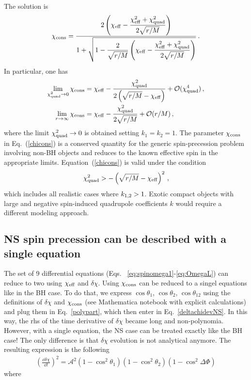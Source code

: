 \documentclass[floats,floatfix,showpacs,amssymb,prd,twocolumn,superscriptaddress,nofootinbib,nolongbibliography,reprint,onecolumn]{revtex4-2}
\newcommand{\chieff}{\chi_{\rm eff}}
\newcommand{\deltachi}{\delta \chi}
\newcommand{\chicons}{\chi_{\rm cons}}
\begin{document}
The solution is 
\begin{align}
\label{chicons}
\chi_{\rm cons} =  \frac{\displaystyle 
2 \left( \chi_{\rm eff}-\frac{\chi_{\rm eff}^2+\chi_{\rm quad}^2}{2 \sqrt{r/M}}\right)}
{\displaystyle 1+ \sqrt{1- \frac{2}{\sqrt{r/M}}\left( {\chi_{\rm eff}-\frac{\chi_{\rm eff}^2+\chi_{\rm quad}^2}{2
   \sqrt{r/M}}}\right)}}\,.
\end{align}
In particular, one has
\begin{align}
\displaystyle \lim_{\chi_{\rm quad}^2 \to  0}\chi_{\rm cons} &= \chi_{\rm eff} - \frac{\chi_{\rm quad}^2}{2\left(\sqrt{r/M} - \chi_{\rm eff}\right) } + \mathcal{O}(\chi_{\rm quad}^4)\,,
\\
\displaystyle \lim_{r\to  \infty}\chi_{\rm cons} &= \chi_{\rm eff} - \frac{\chi_{\rm quad}^2}{2 \sqrt{r/M}} + \mathcal{O}(r/M)\,, 
\end{align}
where  the limit $\chi_{\rm quad}^2 \to  0$ is obtained setting  $k_1=k_2=1$.
The parameter $\chi_{\rm cons}$ in Eq.~(\ref{chicons}) is a conserved quantity for the generic spin-precession problem involving non-BH objects and reduces to the known effective spin in the appropriate limits.  Equation~(\ref{chicons}) is valid under the condition 
\begin{align} \label{chiconscondition}
\chi_{\rm quad}^2> - \left(\sqrt{r/M} - \chi_{\rm eff}\right)^2\,,
\end{align}
 which includes all realistic cases where $k_{\rm 1,2}>1$. Exotic compact objects with large and negative spin-induced quadrupole coefficients $k$ would require a different modeling approach. 
 \subsection {NS spin precession can be described with a single equation}
The set of 9 differential equations (Eqs. ~\eqref{eq:spinomega1}-\eqref{eq:OmegaL}) can reduce to two using $\chieff$ and $\deltachi$. Using $\chicons$ can be reduced to a singel equations like in the BH case.
To do that, we express $\cos \theta_1$, $\cos \theta_2$, $\cos \theta_{12}$ using the definitions of $\deltachi$ and $\chicons$ (see Mathematica notebook with explicit calculations) and plug them in Eq.~\eqref{polypart}, which then enter in Eq.~\eqref{deltachidevNS}. In this way, the rhs of the time derivative of  $\deltachi$ became long and non-polynomia.
However, with a single equation, the NS case can be treated exactly like the BH case! The only difference is that $\deltachi$ evolution is not analytical anymore.
The resulting expression is the following 
\begin{align}\label{ddeltachidtexp}
\left(\frac{\dd \deltachi}{\dd t}\right)^2= \mathcal{A} ^2(1-\cos^2 \theta_1) (1-\cos ^2\theta_2)  (1-\cos^2 \Delta \Phi)
\end{align} 
where
\end{document}
